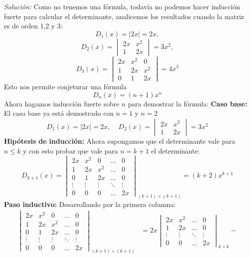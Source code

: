 \documentclass{article}
\newenvironment{solution}
    {\textit{Solución:}}
    {}
\begin{document}
\begin{solution}
    Como no tenemos una fórmula, todavía no podemos hacer inducción fuerte para calcular el determinante, analicemos los resultados cuando la matriz es de orden 1,2 y 3:
\[
D_1(x) = |2x| = 2x,
\]\[
D_2(x) = \begin{vmatrix} 2x & x^2 \\ 1 & 2x \end{vmatrix}= 3x^2,
\]\[
D_3(x)=\begin{vmatrix} 2x & x^2 & 0 \\ 1 & 2x & x^2 \\ 0 & 1 & 2x\end{vmatrix} = 4x^3
\]
Esto nos permite conjeturar una fórmula
\[
D_n(x)=(n+1)x^n
\]
Ahora hagamos inducción fuerte sobre $n$ para demostrar la fórmula:
\textbf{Caso base:} El caso base ya está demostrado con $n=1$ y $n=2$
\[
D_1(x) = |2x| = 2x, \ \ \ \ \ D_2(x) = \begin{vmatrix} 2x & x^2 \\ 1 & 2x \end{vmatrix}= 3x^2
\]
\textbf{Hipótesis de inducción:} Ahora supongamos que el determinante vale para $n\leq k$ y con esto probar que vale para $n=k+1$ el determinante:
\[
D_{k+1}(x) = 
\begin{vmatrix}
2x & x^2 & 0 & \dots & 0 \\
1 & 2x & x^2 & \dots & 0 \\
0 & 1 & 2x & \dots & 0 \\
\vdots & \vdots & \vdots & \ddots & \vdots \\
0 & 0 & 0 & \dots & 2x
\end{vmatrix}_{(k+1)\times(k+1)} = (k+2)x^{k+1}
\]
\textbf{Paso inductivo:} Desarrollando por la primera columna:
\[
\begin{aligned}
\begin{vmatrix}
2x & x^2 & 0 & \dots & 0 \\
1 & 2x & x^2 & \dots & 0 \\
0 & 1 & 2x & \dots & 0 \\
\vdots & \vdots & \vdots & \ddots & \vdots \\
0 & 0 & 0 & \dots & 2x
\end{vmatrix}_{(k+1)\times(k+1)} &= 2x 
\begin{vmatrix}
2x & x^2 & \dots & 0 \\
1 & 2x & \dots & 0 \\
\vdots & \vdots & \ddots & \vdots \\
0 & 0 & \dots & 2x
\end{vmatrix}_{k\times k} - 

\end{aligned}\]
\end{solution}
\end{document}
